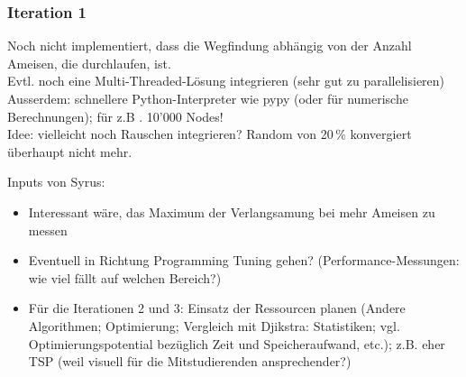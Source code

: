 \subsubsection*{Iteration 1}

Noch nicht implementiert, dass die Wegfindung abhängig von der Anzahl Ameisen, die durchlaufen, ist. \\

Evtl. noch eine Multi-Threaded-Lösung integrieren (sehr gut zu parallelisieren) \\

Ausserdem: schnellere Python-Interpreter wie pypy (oder für numerische Berechnungen); für z.B . 10'000 Nodes! \\

Idee: vielleicht noch Rauschen integrieren? Random von 20\,\% konvergiert überhaupt nicht mehr.

\vspace*{3cm}


Inputs von Syrus: \\

\begin{itemize}
\item Interessant wäre, das Maximum der Verlangsamung bei mehr Ameisen zu messen
\item Eventuell in Richtung Programming Tuning gehen? (Performance-Messungen: wie viel fällt auf welchen Bereich?) 
\item Für die Iterationen 2 und 3: Einsatz der Ressourcen planen (Andere Algorithmen; Optimierung; Vergleich mit Djikstra: Statistiken; vgl. Optimierungspotential bezüglich Zeit und Speicheraufwand, etc.); z.B. eher TSP (weil visuell für die Mitstudierenden ansprechender?) 
\end{itemize}